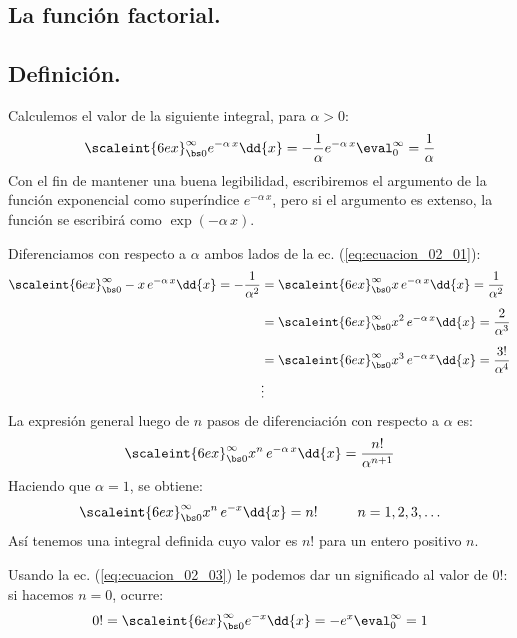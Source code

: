 \subsection{La función factorial.}

\subsection{Definición.}

Calculemos el valor de la siguiente integral, para $\alpha > 0$:
\begin{align}
\scaleint{6ex}_{\bs 0}^{\infty} e^{-\alpha \, x} \dd{x} = - \dfrac{1}{\alpha} e^{-\alpha \, x}\eval_{0}^{\infty} = \dfrac{1}{\alpha}
\label{eq:ecuacion_02_01_Boas}
\end{align}
Con el fin de mantener una buena legibilidad, escribiremos el argumento de la función exponencial como superíndice $e^{-\alpha \, x}$, pero si el argumento es extenso, la función se escribirá como $\exp(-\alpha \, x)$.
\par
Diferenciamos con respecto a $\alpha$ ambos lados de la ec. (\ref{eq:ecuacion_02_01}):
\begin{align*}
\scaleint{6ex}_{\bs 0}^{\infty} - x \, e^{-\alpha \, x} \dd{x} = - \dfrac{1}{\alpha^{2}} &= \scaleint{6ex}_{\bs 0}^{\infty} x \, e^{-\alpha \, x} \dd{x} = \dfrac{1}{\alpha^{2}} \\[0.5em]
&= \scaleint{6ex}_{\bs 0}^{\infty} x^{2} \, e^{-\alpha \, x} \dd{x} = \dfrac{2}{\alpha^{3}} \\[0.5em]
&= \scaleint{6ex}_{\bs 0}^{\infty} x^{3} \, e^{-\alpha \, x} \dd{x} = \dfrac{3!}{\alpha^{4}} \\
& \vdots
\end{align*}
La expresión general luego de $n$ pasos de diferenciación con respecto a $\alpha$ es:
\begin{align}
\scaleint{6ex}_{\bs 0}^{\infty} x^{n} \, e^{-\alpha \, x} \dd{x} = \dfrac{n!}{\alpha^{n+1}}
\label{eq:ecuacion_02_02}
\end{align}
Haciendo que $\alpha = 1$, se obtiene:
\begin{align}
\scaleint{6ex}_{\bs 0}^{\infty} x^{n} \, e^{-x} \dd{x} = n! \hspace{1cm} n = 1, 2, 3, \ldots
\label{eq:ecuacion_02_03}
\end{align}
Así tenemos una integral definida cuyo valor es $n!$ para un entero positivo $n$.
\par
Usando la ec. (\ref{eq:ecuacion_02_03}) le podemos dar un significado al valor de $0!$: si hacemos $n = 0$, ocurre:
\begin{align}
0! = \scaleint{6ex}_{\bs 0}^{\infty} e^{-x} \dd{x} = -e^{x}\eval_{0}^{\infty} = 1
\label{eq:ecuacion_02_04}
\end{align}

